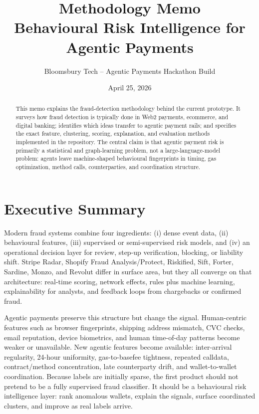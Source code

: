 \documentclass[11pt]{article}
\title{\textbf{Methodology Memo}\\
\large Behavioural Risk Intelligence for Agentic Payments}
\author{Bloomsbury Tech -- Agentic Payments Hackathon Build}
\date{April 25, 2026}
\newcommand{\code}[1]{\texttt{\detokenize{#1}}}
\begin{document}
\maketitle

\begin{abstract}
This memo explains the fraud-detection methodology behind the current
\code{agentic-payments} prototype.  It surveys how fraud detection is
typically done in Web2 payments, ecommerce, and digital banking; identifies
which ideas transfer to agentic payment rails; and specifies the exact
feature, clustering, scoring, explanation, and evaluation methods implemented
in the repository.  The central claim is that agentic payment risk is primarily
a statistical and graph-learning problem, not a large-language-model problem:
agents leave machine-shaped behavioural fingerprints in timing, gas
optimization, method calls, counterparties, and coordination structure.
\end{abstract}

\section{Executive Summary}

Modern fraud systems combine four ingredients: (i) dense event data, (ii)
behavioural features, (iii) supervised or semi-supervised risk models, and
(iv) an operational decision layer for review, step-up verification, blocking,
or liability shift.  Stripe Radar, Shopify Fraud Analysis/Protect, Riskified,
Sift, Forter, Sardine, Monzo, and Revolut differ in surface area, but they all
converge on that architecture: real-time scoring, network effects, rules plus
machine learning, explainability for analysts, and feedback loops from
chargebacks or confirmed fraud.

Agentic payments preserve this structure but change the signal.  Human-centric
features such as browser fingerprints, shipping address mismatch, CVC checks,
email reputation, device biometrics, and human time-of-day patterns become
weaker or unavailable.  New agentic features become available: inter-arrival
regularity, 24-hour uniformity, gas-to-basefee tightness, repeated calldata,
contract/method concentration, late counterparty drift, and wallet-to-wallet
coordination.  Because labels are initially sparse, the first product should
not pretend to be a fully supervised fraud classifier.  It should be a
behavioural risk intelligence layer: rank anomalous wallets, explain the
signals, surface coordinated clusters, and improve as real labels arrive.
\end{document}
